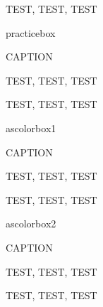 \begin{rv@ascolorbox5@nocaption}

TEST, TEST, TEST

\end{rv@ascolorbox5@nocaption}

% 
% 
% 
% 
% 
% 
% 
% 

practicebox
\begin{practicebox}{CAPTION}

TEST, TEST, TEST

\end{practicebox}

\begin{practicebox}{}

TEST, TEST, TEST

\end{practicebox}

ascolorbox1

\begin{ascolorbox1}{CAPTION}

TEST, TEST, TEST

\end{ascolorbox1}

\begin{ascolorbox1}{}

TEST, TEST, TEST

\end{ascolorbox1}

ascolorbox2

\begin{ascolorbox2}{CAPTION}

TEST, TEST, TEST

\end{ascolorbox2}

\begin{ascolorbox2}{}

TEST, TEST, TEST

\end{ascolorbox2}

